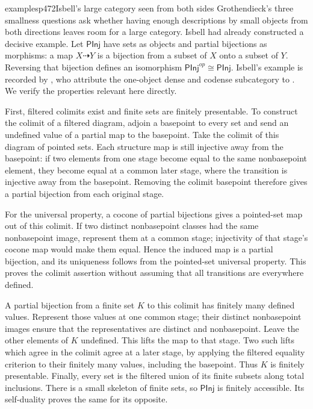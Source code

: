 \begin{dcomment}{examples}{p472}{Isbell's large category seen from both sides}
Grothendieck's three smallness questions ask whether having enough descriptions by small objects from both directions leaves room for a large category. Isbell had already constructed a decisive example. Let $\mathsf{PInj}$ have sets as objects and partial bijections as morphisms: a map $X\dashrightarrow Y$ is a bijection from a subset of $X$ onto a subset of $Y$. Reversing that bijection defines an isomorphism $\mathsf{PInj}^{op}\cong\mathsf{PInj}$. Isbell's example is recorded by \citet[Example~8.7]{AveryLeinster2021}, who attribute the one-object dense and codense subcategory to \citet[Example~1]{Isbell1968Small}. We verify the properties relevant here directly.

First, filtered colimits exist and finite sets are finitely presentable. To construct the colimit of a filtered diagram, adjoin a basepoint to every set and send an undefined value of a partial map to the basepoint. Take the colimit of this diagram of pointed sets. Each structure map is still injective away from the basepoint: if two elements from one stage become equal to the same nonbasepoint element, they become equal at a common later stage, where the transition is injective away from the basepoint. Removing the colimit basepoint therefore gives a partial bijection from each original stage.

For the universal property, a cocone of partial bijections gives a pointed-set map out of this colimit. If two distinct nonbasepoint classes had the same nonbasepoint image, represent them at a common stage; injectivity of that stage's cocone map would make them equal. Hence the induced map is a partial bijection, and its uniqueness follows from the pointed-set universal property. This proves the colimit assertion without assuming that all transitions are everywhere defined.

A partial bijection from a finite set $K$ to this colimit has finitely many defined values. Represent those values at one common stage; their distinct nonbasepoint images ensure that the representatives are distinct and nonbasepoint. Leave the other elements of $K$ undefined. This lifts the map to that stage. Two such lifts which agree in the colimit agree at a later stage, by applying the filtered equality criterion to their finitely many values, including the basepoint. Thus $K$ is finitely presentable. Finally, every set is the filtered union of its finite subsets along total inclusions. There is a small skeleton of finite sets, so $\mathsf{PInj}$ is finitely accessible. Its self-duality proves the same for its opposite.


\end{dcomment}
